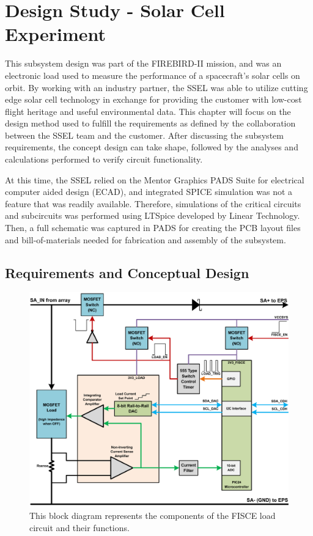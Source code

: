 \chapter{Design Study - Solar Cell Experiment}\label{CH:Design1}
This subsystem design was part of the FIREBIRD-II mission, and was an electronic load used to measure the performance of a spacecraft's solar cells on orbit. By working with an industry partner, the SSEL was able to utilize cutting edge solar cell technology in exchange for providing the customer with low-cost flight heritage and useful environmental data. This chapter will focus on the design method used to fulfill the requirements as defined by the collaboration between the SSEL team and the customer. After discussing the subsystem requirements, the concept design can take shape, followed by the analyses and calculations performed to verify circuit functionality. 

At this time, the SSEL relied on the Mentor Graphics PADS Suite for electrical computer aided design (ECAD), and integrated SPICE simulation was not a feature that was readily available. Therefore, simulations of the critical circuits and subcircuits was performed using LTSpice developed by Linear Technology. Then, a full schematic was captured in PADS for creating the PCB layout files and bill-of-materials needed for fabrication and assembly of the subsystem. 

\section{Requirements and Conceptual Design}\label{Sect:fisce_concept}



\begin{figure}[htbp]
	\centering
	\includegraphics[width=\textwidth]{../figs/fisce/concept/fisce_panel_diagram_load_control.pdf}
	\caption{This block diagram represents the components of the FISCE load circuit and their functions.}
	\label{fig:fisce_block}
\end{figure}



